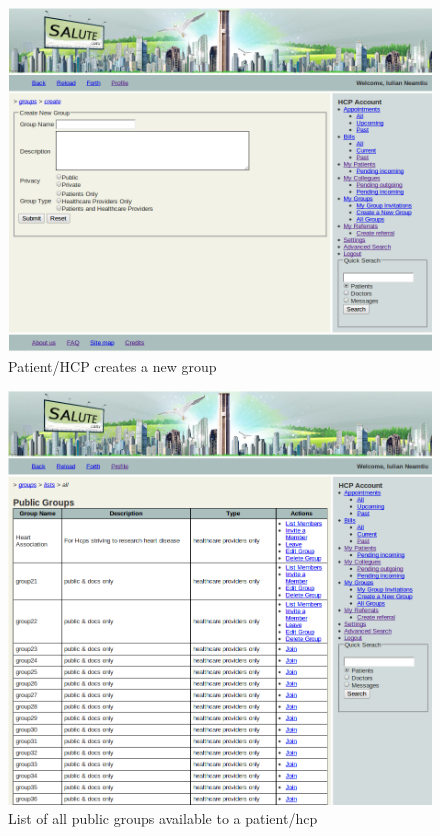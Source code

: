 \begin{figure}
\includegraphics[scale=0.5]{screenshots/create_a_new_group.png}
\caption{Patient/HCP creates a new group}
\end{figure}

\begin{figure}
\includegraphics[scale=0.5]{screenshots/all_public_groups.png}
\caption{List of all public groups available to a patient/hcp}
\end{figure}

